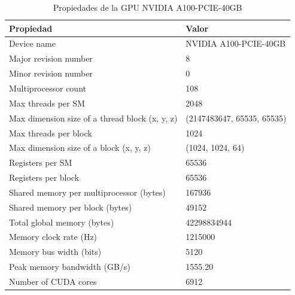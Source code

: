 \documentclass{article}
\begin{document}
		\begin{table}[H]
			\centering
			\begin{tabular}{|l|l|}
				\hline
				\textbf{Propiedad} & \textbf{Valor} \\ \hline
				Device name & NVIDIA A100-PCIE-40GB \\ \hline
				Major revision number & 8 \\ \hline
				Minor revision number & 0 \\ \hline
				Multiprocessor count & 108 \\ \hline
				Max threads per SM & 2048 \\ \hline
				Max dimension size of a thread block (x, y, z) & (2147483647, 65535, 65535) \\ \hline
				Max threads per block & 1024 \\ \hline
				Max dimension size of a block (x, y, z) & (1024, 1024, 64) \\ \hline
					Registers per SM & 65536 \\ \hline
				Registers per block & 65536 \\ \hline
				Shared memory per multiprocessor (bytes) & 167936 \\ \hline
				Shared memory per block (bytes) & 49152 \\ \hline
				Total global memory (bytes) & 42298834944 \\ \hline
				Memory clock rate (Hz) & 1215000 \\ \hline
				Memory bus width (bits) & 5120 \\ \hline
				Peak memory bandwidth (GB/s) & 1555.20 \\ \hline
				Number of CUDA cores & 6912 \\ \hline
			\end{tabular}
			\caption{Propiedades de la GPU NVIDIA A100-PCIE-40GB}
		\end{table}
\end{document}
